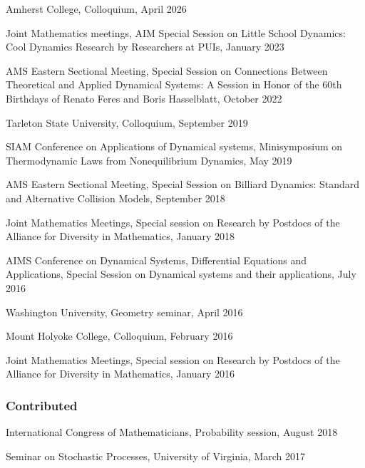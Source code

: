 \documentclass[10pt,letterpaper]{article}
\renewenvironment{itemize}{
  \begin{list}{}{
    \setlength{\leftmargin}{1.5em}
    \setlength{\itemsep}{0.25em}
    \setlength{\parskip}{0pt}
    \setlength{\parsep}{0.25em}
  }
}{
  \end{list}
}
\begin{document}
\begin{itemize}
\item
  Amherst College, Colloquium, April 2026
\item
  Joint Mathematics meetings, AIM Special Session on Little School
  Dynamics: Cool Dynamics Research by Researchers at PUIs, January 2023
\item
  AMS Eastern Sectional Meeting, Special Session on Connections Between
  Theoretical and Applied Dynamical Systems: A Session in Honor of the
  60th Birthdays of Renato Feres and Boris Hasselblatt, October 2022
\item
  Tarleton State University, Colloquium, September 2019
\item
  SIAM Conference on Applications of Dynamical systems, Minisymposium on
  Thermodynamic Laws from Nonequilibrium Dynamics, May 2019
\item
  AMS Eastern Sectional Meeting, Special Session on Billiard Dynamics:
  Standard and Alternative Collision Models, September 2018
\item
  Joint Mathematics Meetings, Special session on Research by Postdocs of
  the Alliance for Diversity in Mathematics, January 2018
\item
  AIMS Conference on Dynamical Systems, Differential Equations and
  Applications, Special Session on Dynamical systems and their
  applications, July 2016
\item
  Washington University, Geometry seminar, April 2016
\item
  Mount Holyoke College, Colloquium, February 2016
\item
  Joint Mathematics Meetings, Special session on Research by Postdocs of
  the Alliance for Diversity in Mathematics, January 2016
\end{itemize}

\hypertarget{contributed}{%
\subsubsection*{Contributed}\label{contributed}}

\begin{itemize}
\item
  International Congress of Mathematicians, Probability session, August
  2018
\item
  Seminar on Stochastic Processes, University of Virginia, March 2017
\end{itemize}
\end{document}

